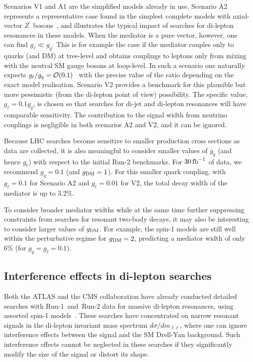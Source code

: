 \documentclass[review]{elsarticle}
\newcommand{\gDM}{\ensuremath{g_{\rm{DM}}}\xspace}
\newcommand{\gq}{\ensuremath{g_q}\xspace}
\begin{document}
Scenarios V1 and A1 are the simplified models already in use. Scenario A2 represents a representative case found in the simplest complete models with axial-vector $Z^\prime$ bosons~\cite{Kahlhoefer:2015bea}, 
and illustrates the typical impact of searches for di-lepton resonances in these models. When the mediator is a pure vector, however, one can find $g_\ell \ll g_q$. This is for example the case if the mediator couples only to quarks (and DM) at tree-level and  obtains couplings to leptons only from mixing with the neutral SM gauge bosons at loop-level. In such a scenario one naturally expects $g_\ell/g_q = {\cal O} (0.1)$~\cite{Duerr:2016tmh} with the precise value of the ratio depending on the exact model realisation. 
Scenario V2 provides a benchmark for this plausible but more pessimistic (from the di-lepton point of view) possibility. The specific value, $g_\ell = 0.1 g_q$, is chosen so that searches for di-jet and di-lepton resonances will have comparable sensitivity. The contribution to the signal width from neutrino couplings is negligible in both scenarios A2 and V2, and it can be ignored. 

Because LHC searches become sensitive to smaller production cross sections as data are collected, it is also meaningful to consider smaller values of $g_q$ (and hence $g_\ell$) with respect to the initial Run-2 benchmarks. For $30 \, {\rm fb}^{-1}$ of data, we recommend $\gq = 0.1$ (and $\gDM = 1$). For this smaller quark coupling, with $g_\ell = 0.1$ for Scenario A2 and $g_\ell = 0.01$ for V2, the total decay width of the mediator is up to 3.2\%. 

To consider broader mediator widths while at the same time further suppressing constraints from searches for resonant two-body decays, it may also be interesting to consider larger values of $\gDM$. For example, the spin-1 models are still well within the perturbative regime for $\gDM = 2$, predicting a mediator width of only 6\% (for $\gq = g_\ell = 0.1$).

\subsection{Interference effects in di-lepton searches}

Both the ATLAS and the CMS collaboration have already conducted detailed searches with Run-1~and~Run-2 data for massive di-lepton resonances, using assorted spin-1 models~\cite{Aad:2014cka,Khachatryan:2014fba,Aaboud:2016cth,Khachatryan:2016zqb,Khachatryan:2016qkc,Aaboud:2016cth}. These searches have concentrated on narrow resonant signals in the di-lepton invariant mass spectrum $d \sigma/d m_{\ell \ell}$, where one can ignore interference effects between the signal and the SM Drell-Yan background. Such interference 
effects cannot be neglected in these searches if 
they significantly modify the size of the signal or distort its shape. 
\end{document}
